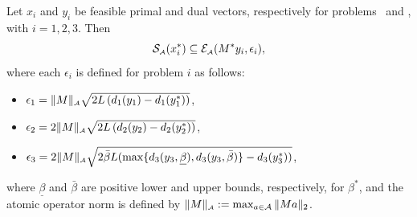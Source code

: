 \begin{theorem}\label{thm:p0}
    Let $x_i$ and $y_i$ be feasible primal and dual vectors, respectively for
    problems \Probi\ and \Drobi, with $i = 1, 2, 3$. Then
    \begin{equation}\label{eq:1} 
      \operatorname{\mathcal{S}_{\scriptscriptstyle\mathcal{A}}}(x_i^*) \subseteq \mathcal{E}_{\scriptscriptstyle\mathcal{A}}(M^*y_i, \epsilon_i),
    \end{equation}
    where each $\epsilon_i$ is defined for problem $i$ as follows:
    \begin{itemize} 
    \item \label{thm:p1} $\epsilon_1 = \|M\|_{\scriptscriptstyle\mathcal{A}}\sqrt{2L \left( d_1(y_1) - d_1(y_1^*) \right)}$,
  
    \item \label{thm:p2} $\epsilon_2 = 2\|M\|_{\scriptscriptstyle\mathcal{A}}\sqrt{2L \left( d_2(y_2) - d_2(y_2^*) \right)}$,
      
    \item \label{thm:p3} $\epsilon_3 = 2\|M\|_{\scriptscriptstyle\mathcal{A}}\sqrt{2\bar{\beta}L (
          \max\{d_3(y_3, \underline{\beta}), d_3(y_3, \bar{\beta})\} - d_3( y_3^* ) ) }$, 
    \end{itemize}
    where $\underline{\beta}$ and $\bar{\beta}$ are positive lower and
    upper bounds, respectively, for $\beta^*$, and the atomic operator norm is defined by 
    $\|M\|_{\scriptscriptstyle\mathcal{A}}:=\max_{a\in\mathcal{A}}\|Ma\|_2$.
\end{theorem}

